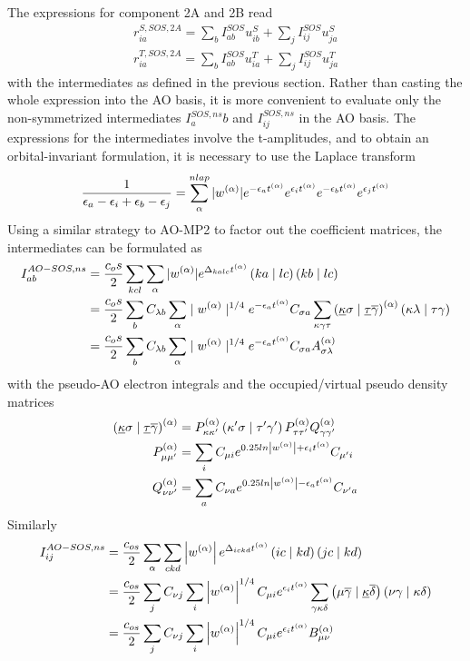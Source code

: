 The expressions for component 2A and 2B read
\begin{align}
r_{ia}^{S,SOS,2A} = \sum_b I^{SOS}_{ab} u^S_{ib} + \sum_j I^{SOS}_{ij} u^S_{ja} \\
r_{ia}^{T,SOS,2A} = \sum_b I^{SOS}_{ab} u^T_{ia} + \sum_j I^{SOS}_{ij} u^T_{ja} 
\end{align}
\noindent with the intermediates as defined in the previous section. Rather than casting the whole expression into the AO basis, it is more convenient to evaluate only the non-symmetrized intermediates $I^{SOS,ns}_ab$ and $I^{SOS,ns}_{ij}$ in the AO basis.
The expressions for the intermediates involve the t-amplitudes, and to obtain an orbital-invariant formulation, it is necessary to use the Laplace transform
\begin{equation}
\frac{1}{\epsilon_a - \epsilon_i + \epsilon_b - \epsilon_j} = \sum^{nlap}_{\alpha} |w^{(\alpha)}| e^{-\epsilon_a t^{(\alpha)}} e^{\epsilon_i t^{(\alpha)}} e^{-\epsilon_b t^{(\alpha)}} e^{\epsilon_j t^{(\alpha)}} 
\end{equation}
\noindent Using a similar strategy to AO-MP2 to factor out the coefficient matrices, the intermediates can be formulated as
\begin{align}
I_{ab}^{AO-SOS,ns} &= \frac{c_os}{2} \sum_{kcl} \sum_{\alpha} |w^{(\alpha)}| e^{\Delta_{kalc}t^{(\alpha)}} \left( ka \mid lc \right) \left( kb \mid lc \right) \\
&= \frac{c_os}{2} \sum_b C_{\lambda b} \sum_{\alpha} \mid w^{(\alpha)}\mid^{1/4} e^{-\epsilon_a t^{(\alpha)}} C_{\sigma a} \sum_{\kappa \gamma \tau} \left( \underline{\kappa} \sigma \mid \underline{\tau} \overline{\gamma} \right)^{(\alpha)} \left( \kappa \lambda \mid \tau \gamma \right) \\
&= \frac{c_os}{2} \sum_b C_{\lambda b} \sum_{\alpha} \mid w^{(\alpha)}\mid^{1/4} e^{-\epsilon_a t^{(\alpha)}} C_{\sigma a} A^{(\alpha)}_{\sigma\lambda}
\end{align}
\noindent with the pseudo-AO electron integrals and the occupied/virtual pseudo density matrices
\begin{align}
\left( \underline{\kappa} \sigma \mid \underline{\tau} \overline{\gamma} \right)^{(\alpha)} &= P_{\kappa\kappa'}^{(\alpha)} \left( \kappa' \sigma \mid \tau' \gamma' \right) P_{\tau\tau'}^{(\alpha)} Q_{\gamma\gamma'}^{(\alpha)} \\
P_{\mu\mu'}^{(\alpha)} &= \sum_i C_{\mu i} e^{0.25 ln\left\lvert w^{(\alpha)} \right\rvert + \epsilon_i t^{(\alpha)}} C_{\mu' i} \\
Q_{\nu\nu'}^{(\alpha)} &= \sum_a C_{\nu a} e^{0.25 ln\left\lvert w^{(\alpha)} \right\rvert - \epsilon_a t^{(\alpha)}} C_{\nu' a}
\end{align}
Similarly
\begin{align}
I_{ij}^{AO-SOS,ns} &= \frac{c_{os}}{2} \sum_{\alpha} \sum_{ckd} \left\lvert w^{(\alpha)} \right\rvert e^{\Delta_{ickd}t^{(\alpha)}} \left( ic \mid kd \right) \left( jc \mid kd \right) \\
&= \frac{c_{os}}{2} \sum_j C_{\nu j} \sum_i \left\lvert w^{(\alpha)} \right\rvert^{1/4} C_{\mu i} e^{\epsilon_i t^{(\alpha)}} \sum_{\gamma\kappa\delta} \left( \mu\overline{\gamma} \mid \underline{\kappa}\overline{\delta} \right) \left( \nu\gamma \mid \kappa\delta \right) \\
&= \frac{c_{os}}{2} \sum_j C_{\nu j} \sum_i \left\lvert w^{(\alpha)} \right\rvert^{1/4} C_{\mu i} e^{\epsilon_i t^{(\alpha)}} B_{\mu\nu}^{(\alpha)}
\end{align}
